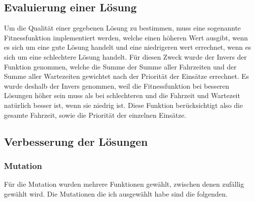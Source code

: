 \documentclass[a4paper,notitlepage,12pt]{report}
\begin{document}
\subsection{Evaluierung einer Lösung}

Um die Qualität einer gegebenen Lösung zu bestimmen, muss eine sogenannte
Fitnessfunktion implementiert werden, welche einen höheren Wert ausgibt, wenn es
sich um eine gute Lösung handelt und eine niedrigeren wert errechnet, wenn es sich
um eine schlechtere Lösung handelt. Für diesen Zweck  wurde der Invers der Funktion
genommen, welche die Summe der Summe aller Fahrzeiten und der Summe aller
Wartezeiten gewichtet nach der Priorität der Einsätze errechnet. Es wurde deshalb
der Invers genommen, weil die Fitnessfunktion bei besseren Lösungen höher sein
muss als bei schlechteren und die Fahrzeit und Wartezeit natürlich besser ist,
wenn sie niedrig ist.
Diese Funktion berücksichtigt also die gesamte Fahrzeit, sowie die Priorität
der einzelnen Einsätze.

\subsection{Verbesserung der Lösungen}

\subsubsection{Mutation}

Für die Mutation wurden mehrere Funktionen gewählt, zwischen denen zufällig gewählt wird.
Die Mutationen die ich ausgewählt habe sind die folgenden.
\end{document}
